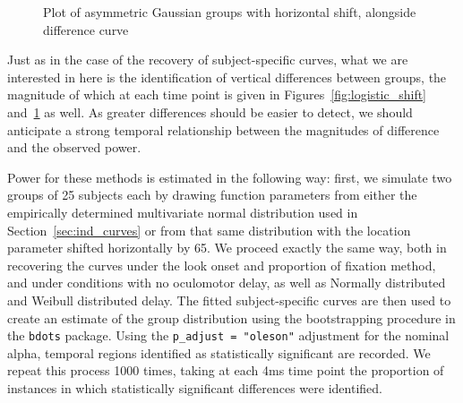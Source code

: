 \documentclass{article}
\newcommand{\xt}{\texttt}
\begin{document}
\begin{figure}[H]
    \caption{Plot of asymmetric Gaussian groups with horizontal shift, alongside difference curve}
\label{fig:dg_shift}
\end{figure}

Just as in the case of the recovery of subject-specific curves, what we are interested in here is the identification of vertical differences between groups, the magnitude of which at each time point is given in Figures~\ref{fig:logistic_shift} and~\ref{fig:dg_shift} as well. As greater differences should be easier to detect, we should anticipate a strong temporal relationship between the magnitudes of difference  and the observed power.

Power for these methods is estimated in the following way: first, we simulate two groups of 25 subjects each by drawing function parameters from either the empirically determined multivariate normal distribution used in Section~\ref{sec:ind_curves} or from that same distribution with the location parameter shifted horizontally by 65. We proceed exactly the same way, both in recovering the curves under the look onset and proportion of fixation method, and under conditions with no oculomotor delay, as well as Normally distributed and Weibull distributed delay. The fitted subject-specific curves are then used to create an estimate of the group distribution using the bootstrapping procedure in the \xt{bdots} package. Using the \xt{p\_adjust = "oleson"} adjustment for the nominal alpha, temporal regions identified as statistically significant are recorded. We repeat this process 1000 times, taking at each 4ms time point the proportion of instances in which statistically significant differences were identified.
\end{document}
